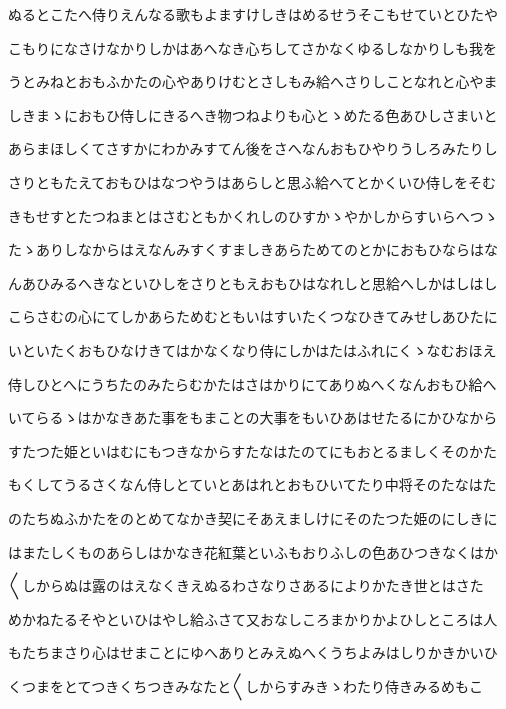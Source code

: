 \documentclass[a4paper,11pt,landscape]{ltjtarticle}
\begin{document}
\par\medskip
ぬるとこたへ侍りえんなる歌もよますけしきはめるせうそこもせていとひたや
\par\medskip
こもりになさけなかりしかはあへなき心ちしてさかなくゆるしなかりしも我を
\par\medskip
うとみねとおもふかたの心やありけむとさしもみ給へさりしことなれと心やま
\par\medskip
しきまゝにおもひ侍しにきるへき物つねよりも心とゝめたる色あひしさまいと
\par\medskip
あらまほしくてさすかにわかみすてん後をさへなんおもひやりうしろみたりし
\par\medskip
さりともたえておもひはなつやうはあらしと思ふ給へてとかくいひ侍しをそむ
\par\medskip
きもせすとたつねまとはさむともかくれしのひすかゝやかしからすいらへつゝ
\par\medskip
たゝありしなからはえなんみすくすましきあらためてのとかにおもひならはな
\par\medskip
んあひみるへきなといひしをさりともえおもひはなれしと思給へしかはしはし
\par\medskip
こらさむの心にてしかあらためむともいはすいたくつなひきてみせしあひたに
\par\medskip
いといたくおもひなけきてはかなくなり侍にしかはたはふれにくゝなむおほえ
\par\medskip
侍しひとへにうちたのみたらむかたはさはかりにてありぬへくなんおもひ給へ
\par\medskip
いてらるゝはかなきあた事をもまことの大事をもいひあはせたるにかひなから
\par\medskip
すたつた姫といはむにもつきなからすたなはたのてにもおとるましくそのかた
\par\medskip
もくしてうるさくなん侍しとていとあはれとおもひいてたり中将そのたなはた
\par\medskip
のたちぬふかたをのとめてなかき契にそあえましけにそのたつた姫のにしきに
\par\medskip
はまたしくものあらしはかなき花紅葉といふもおりふしの色あひつきなくはか
\par\medskip
〱しからぬは露のはえなくきえぬるわさなりさあるによりかたき世とはさた
\par\medskip
めかねたるそやといひはやし給ふさて又おなしころまかりかよひしところは人
\par\medskip
もたちまさり心はせまことにゆへありとみえぬへくうちよみはしりかきかいひ
\par\medskip
くつまをとてつきくちつきみなたと〱しからすみきゝわたり侍きみるめもこ
\end{document}
